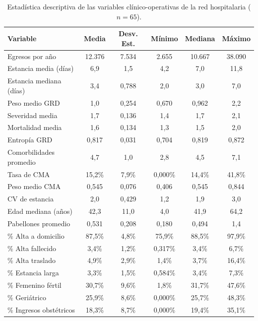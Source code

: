 \begin{table}[htbp]
\centering
\caption{Estadística descriptiva de las variables clínico-operativas de la red
hospitalaria ($n=65$).}
\label{tab:descriptiva-variables}
\begin{tabular}{l c c c c c}
\toprule
\textbf{Variable} & \textbf{Media} & \textbf{Desv. Est.} &
\textbf{Mínimo} & \textbf{Mediana} & \textbf{Máximo} \\
\midrule
Egresos por año & 12.376 & 7.534 & 2.655 & 10.667 & 38.090 \\
Estancia media (días) & 6{,}9 & 1{,}5 & 4{,}2 & 7{,}0 & 11{,}8 \\
Estancia mediana (días) & 3{,}4 & 0{,}788 & 2{,}0 & 3{,}0 & 7{,}0 \\
Peso medio GRD & 1{,}0 & 0{,}254 & 0{,}670 & 0{,}962 & 2{,}2 \\
Severidad media & 1{,}7 & 0{,}136 & 1{,}4 & 1{,}7 & 2{,}1 \\
Mortalidad media & 1{,}6 & 0{,}134 & 1{,}3 & 1{,}5 & 2{,}0 \\
Entropía GRD & 0{,}817 & 0{,}031 & 0{,}704 & 0{,}819 & 0{,}872 \\
Comorbilidades promedio & 4{,}7 & 1{,}0 & 2{,}8 & 4{,}5 & 7{,}1 \\
Tasa de CMA & 15{,}2\% & 7{,}9\% & 0{,}000\% & 14{,}4\% & 41{,}8\% \\
Peso medio CMA & 0{,}545 & 0{,}076 & 0{,}406 & 0{,}545 & 0{,}844 \\
CV de estancia & 2{,}0 & 0{,}429 & 1{,}2 & 1{,}9 & 3{,}0 \\
Edad mediana (años) & 42{,}3 & 11{,}0 & 4{,}0 & 41{,}9 & 64{,}2 \\
Pabellones promedio & 0{,}531 & 0{,}208 & 0{,}180 & 0{,}494 & 1{,}4 \\
\% Alta a domicilio & 87{,}5\% & 4{,}8\% & 75{,}9\% & 88{,}5\% & 97{,}9\% \\
\% Alta fallecido & 3{,}4\% & 1{,}2\% & 0{,}317\% & 3{,}4\% & 6{,}7\% \\
\% Alta traslado & 4{,}9\% & 2{,}9\% & 1{,}4\% & 3{,}7\% & 16{,}4\% \\
\% Estancia larga & 3{,}3\% & 1{,}5\% & 0{,}584\% & 3{,}4\% & 7{,}3\% \\
\% Femenino fértil & 30{,}7\% & 9{,}6\% & 1{,}8\% & 31{,}7\% & 47{,}6\% \\
\% Geriátrico & 25{,}9\% & 8{,}6\% & 0{,}000\% & 25{,}7\% & 48{,}3\% \\
\% Ingresos obstétricos & 18{,}3\% & 8{,}7\% & 0{,}000\% & 19{,}4\% & 35{,}1\% \\

\end{tabular}
\end{table}
